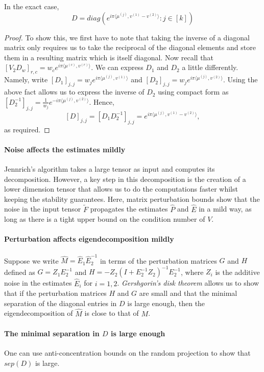 \begin{fact}
    In the exact case, $$D=diag(e^{i\pi\langle\mu^{(j)},v^{(1)}-v^{(2)}\rangle}:j\in[k])$$
\end{fact}
\begin{proof}
    To show this, we first have to note that taking the inverse of a diagonal matrix only requires us to take the reciprocal of the diagonal elements and store them in a resulting matrix which is itself diagonal. Now recall that $[V_2D_w]_{r,c}=w_ce^{i\pi\langle\mu^{(c)},v^{(r)}\rangle}$. We can express $D_1$ and $D_2$ a little differently. Namely, write $[D_1]_{j,j}=w_je^{i\pi\langle\mu^{(j)},v^{(1)}\rangle}$ and $[D_2]_{j,j}=w_je^{i\pi\langle\mu^{(j)},v^{(2)}\rangle}$. Using the above fact allows us to express the inverse of $D_2$ using compact form as $[D_2^{-1}]_{j,j}=\frac{1}{w_j}e^{-i\pi\langle\mu^{(j)},v^{(2)}\rangle}$. Hence, $$[D]_{j,j}=[D_1D_2^{-1}]_{j,j}=e^{i\pi\langle\mu^{(j)},v^{(1)}-v^{(2)}\rangle},$$ as required.
\end{proof}
\paragraph{Noise affects the estimates mildly} Jennrich's algorithm takes a large tensor as input and computes its decomposition. However, a key step in this decomposition is the creation of a lower dimension tensor that allows us to do the computations faster whilst keeping the stability guarantees. Here, matrix perturbation bounds show that the noise in the input tensor $\tilde{F}$ propagates the estimates $\widehat{P}$ and $\widehat{E}$ in a mild way, as long as there is a tight upper bound on the condition number of $V$.
\paragraph{Perturbation affects eigendecomposition mildly} Suppose we write $\widehat{M}=\widehat{E}_1\widehat{E}_2^{-1}$ in terms of the perturbation matrices $G$ and $H$ defined as $G=Z_1E_2^{-1}$ and $H=-Z_2(I+E_2^{-1}Z_2)^{-1}E_2^{-1}$, where $Z_i$ is the additive noise in the estimates $\widehat{E}_i$ for $i=1,2$. \textit{Gershgorin's disk theorem} allows us to show that if the perturbation matrices $H$ and $G$ are small and that the minimal separation of the diagonal entries in $D$ is large enough, then the eigendecomposition of $\widehat{M}$ is close to that of $M$.
\paragraph{The minimal separation in $D$ is large enough} One can use anti-concentration bounds on the random projection to show that $sep(D)$ is large.
